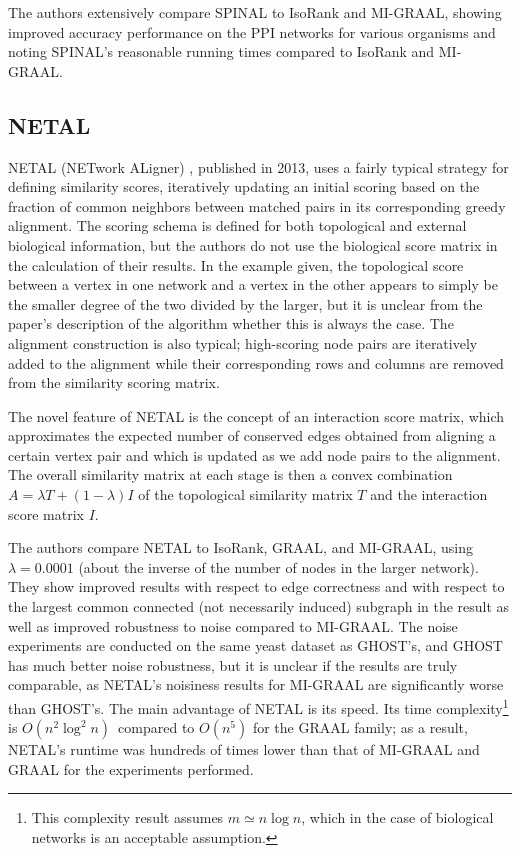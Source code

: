 \documentclass[12pt]{thesis}
\theoremstyle{plain}
\theoremstyle{definition}
\theoremstyle{remark}
\begin{document}
The authors extensively compare SPINAL to IsoRank and MI-GRAAL, showing improved accuracy performance on the PPI networks for various organisms and noting SPINAL's reasonable running times compared to IsoRank and MI-GRAAL.

\subsection{NETAL}

NETAL (NETwork ALigner) \cite{Neyshabur_2013}, published in 2013, uses a fairly typical strategy for defining similarity scores, iteratively updating an initial scoring based on the fraction of common neighbors between matched pairs in its corresponding greedy alignment. The scoring schema is defined for both topological and external biological information, but the authors do not use the biological score matrix in the calculation of their results. In the example given, the topological score between a vertex in one network and a vertex in the other appears to simply be the smaller degree of the two divided by the larger, but it is unclear from the paper's description of the algorithm whether this is always the case. The alignment construction is also typical; high-scoring node pairs are iteratively added to the alignment while their corresponding rows and columns are removed from the similarity scoring matrix. 

The novel feature of NETAL is the concept of an interaction score matrix, which approximates the expected number of conserved edges obtained from aligning a certain vertex pair and which is updated as we add node pairs to the alignment. The overall similarity matrix at each stage is then a convex combination $A = \lambda T + (1-\lambda) I$ of the topological similarity matrix $T$ and the interaction score matrix $I$. 

The authors compare NETAL to IsoRank, GRAAL, and MI-GRAAL, using $\lambda=0.0001$ (about the inverse of the number of nodes in the larger network). They show improved results with respect to edge correctness and with respect to the largest common connected (not necessarily induced) subgraph in the result as well as improved robustness to noise compared to MI-GRAAL. The noise experiments are conducted on the same yeast dataset as GHOST's, and GHOST has much better noise robustness, but it is unclear if the results are truly comparable, as NETAL's noisiness results for MI-GRAAL are significantly worse than GHOST's. The main advantage of NETAL is its speed. Its time complexity\footnote{This complexity result assumes $m \simeq n\log n$, which in the case of biological networks is an acceptable assumption.} is $O(n^2\log^2n)$\, compared to $O(n^5)$ for the GRAAL family; as a result, NETAL's runtime was hundreds of times lower than that of MI-GRAAL and GRAAL for the experiments performed.
\end{document}
